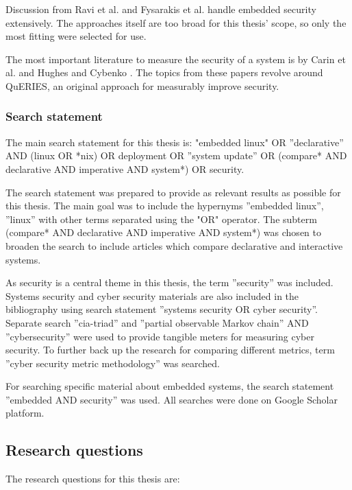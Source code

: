 Discussion from Ravi et al. \cite{ravi2004security} and Fysarakis et
al. \cite{fysarakis2014embedded} handle embedded security
extensively. The approaches itself are too broad for this thesis'
scope, so only the most fitting were selected for use.

The most important literature to measure the security of a system is
by Carin et al. \cite{carin2008cybersecurity} and Hughes and Cybenko
\cite{hughes2013quantitative}. The topics from these papers revolve
around QuERIES, an original approach for measurably improve security.

\subsubsection{Search statement} \label{searchstatement}

The main search statement for this thesis is: "embedded linux" OR
''declarative'' AND (linux OR *nix) OR deployment OR ''system update''
OR (compare* AND declarative AND imperative AND system*) OR security.

The search statement was prepared to provide as relevant results as
possible for this thesis. The main goal was to include the hypernyms
''embedded linux'', ''linux'' with other terms separated using the
"OR" operator. The subterm (compare* AND declarative AND imperative
AND system*) was chosen to broaden the search to include articles
which compare declarative and interactive systems.

As security is a central theme in this thesis, the term ''security'' was
included. Systems security
and cyber security materials are also included in the bibliography using
search statement ''systems security OR cyber security''. Separate search
''cia-triad'' and ''partial observable Markov chain'' AND
''cybersecurity'' were used to provide tangible meters for measuring
cyber security. To further back up the research for comparing
different metrics, term ''cyber security metric methodology'' was
searched.

For searching specific material about embedded systems, the search
statement ''embedded AND security'' was used. All searches were done on Google Scholar platform.

\subsection{Research questions} \label{resquest}

The research questions for this thesis are:

